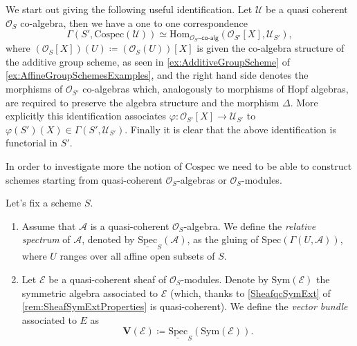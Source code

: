 \begin{rem}[]\label{rem:CospecSections}
	We start out giving the following useful identification.
	Let $\mathcal{U}$ be a quasi coherent $\mathcal{O}_{ S }$ co-algebra,
	then we have a one to one correspondence
	\begin{equation*}
	\Gamma(S', \mathrm{Cospec}(\mathcal{U})) \simeq
	\mathrm{Hom}_{ \mathcal{O}_{ S' }\text{-}\mathsf{co}\text{-}\mathsf{alg}} 
	\left( \mathcal{O}_{ S' }[X], \mathcal{U}_{S'} \right)
	,\end{equation*}
	where $(\mathcal{O}_{ S }[X])(U) \coloneqq (\mathcal{O}_{ S }(U))[X]$ 
	is given the co-algebra structure of the additive group scheme, as seen in
	\cref{ex:AdditiveGroupScheme} of \cref{ex:AffineGroupSchemesExamples},
	and the right hand side denotes the morphisms of $\mathcal{O}_{ S' }$
	co-algebras which, analogously to morphisms of Hopf algebras, 
	are required to preserve the algebra structure and the morphism $\Delta$.
	More explicitly this identification associates
	$\varphi\colon \mathcal{O}_{ S' }[X] \to \mathcal{U}_{S'}$ to
	$\varphi(S')(X) \in \Gamma(S', \mathcal{U}_{S'})$.
	Finally it is clear that the above identification is functorial in $S'$.
\end{rem}


\noindent
In order to investigate more the notion of $\mathrm{Cospec}$ we need to 
be able to construct schemes starting from quasi-coherent $\mathcal{O}_{ S }$-algebras
or $\mathcal{O}_{ S }$-modules.


\begin{defn}
	Let's fix a scheme $S$.
\begin{enumerate}
	\item Assume that $\mathcal{A}$ is a quasi-coherent $\mathcal{O}_{ S }$-algebra.
		We define the {\em relative spectrum} of $\mathcal{A}$, denoted by
		$\underline{\mathrm{Spec}}_S(\mathcal{A})$, as the gluing of
		$\mathrm{Spec}(\Gamma(U, \mathcal{A}))$, where $U$ ranges
		over all affine open subsets of $S$.

	\item  Let $\mathcal{E}$ be a quasi-coherent sheaf of $\mathcal{O}_{ S }$-modules.
		Denote by $\mathrm{Sym}(\mathcal{E})$ the symmetric algebra associated to 
		$\mathcal{E}$ (which, thanks to \cref{SheafqcSymExt} of
		\cref{rem:SheafSymExtProperties} is quasi-coherent).
		We define the {\em vector bundle} associated to $E$ as
		\begin{equation*}
			\mathbf{V}(\mathcal{E}) \coloneqq
			\underline{\mathrm{Spec}}_S (\mathrm{Sym}(\mathcal{E}))
		.\end{equation*}
\end{enumerate}
\end{defn}



